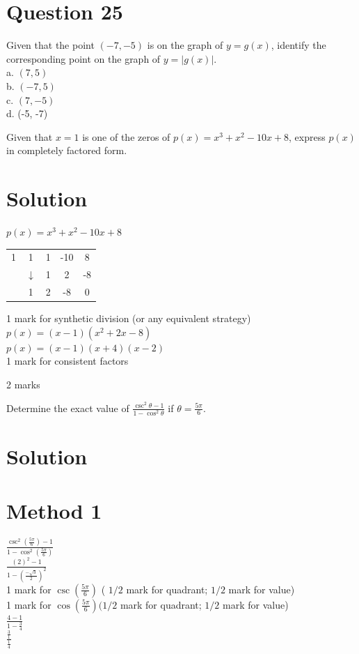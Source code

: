\documentclass[10pt]{article}
\begin{document}
\section*{Question 25}
Given that the point $(-7,-5)$ is on the graph of $y=g(x)$, identify the corresponding point on the graph of $y=|g(x)|$.\\
a. $(7,5)$\\
b. $(-7,5)$\\
c. $(7,-5)$\\
d. (-5, -7)

Given that $x=1$ is one of the zeros of $p(x)=x^{3}+x^{2}-10 x+8$, express $p(x)$ in completely factored form.

\section*{Solution}
$p(x)=x^{3}+x^{2}-10 x+8$

\begin{center}
\begin{tabular}{c|cccc}
1 & 1 & 1 & -10 & 8 \\
 & $\downarrow$ & 1 & 2 & -8 \\
\hline
 & 1 & 2 & -8 & 0 \\
\hline
\end{tabular}
\end{center}

1 mark for synthetic division (or any equivalent strategy)\\
$p(x)=(x-1)\left(x^{2}+2 x-8\right)$\\
$p(x)=(x-1)(x+4)(x-2)$\\
1 mark for consistent factors

2 marks

Determine the exact value of $\frac{\csc ^{2} \theta-1}{1-\cos ^{2} \theta}$ if $\theta=\frac{5 \pi}{6}$.

\section*{Solution}
\section*{Method 1}
$\frac{\csc ^{2}\left(\frac{5 \pi}{6}\right)-1}{1-\cos ^{2}\left(\frac{5 \pi}{6}\right)}$\\
$\frac{(2)^{2}-1}{1-\left(\frac{-\sqrt{3}}{2}\right)^{2}}$\\
1 mark for $\csc \left(\frac{5 \pi}{6}\right)$ ( $1 / 2$ mark for quadrant; $1 / 2$ mark for value)\\
1 mark for $\cos \left(\frac{5 \pi}{6}\right)(1 / 2$ mark for quadrant; $1 / 2$ mark for value)\\
$\frac{4-1}{1-\frac{3}{4}}$\\
$\frac{\frac{3}{1}}{\frac{1}{4}}$
\end{document}
